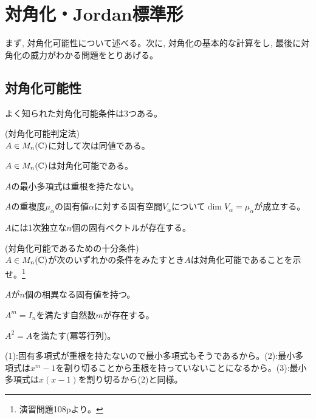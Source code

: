 \section{対角化・Jordan標準形}
まず, 対角化可能性について述べる。次に, 対角化の基本的な計算をし, 最後に対角化の威力がわかる問題をとりあげる。
\subsection{対角化可能性}
よく知られた対角化可能条件は3つある。
\besha
\begin{prop} (対角化可能判定法)\\
$A\in M_n(\mathbb{C})$に対して次は同値である。
\ben
\item $A\in M_n(\mathbb{C})$は対角化可能である。
\item $A$の最小多項式は重根を持たない。
\item $A$の重複度$\mu_{\alpha}$の固有値$\alpha$に対する固有空間$V_{\alpha}$について$\dim{V_{\alpha}} = \mu_{\alpha}$が成立する。
\item $A$には1次独立な$n$個の固有ベクトルが存在する。
\een
\end{prop}
\ensha
\begin{egprob} (対角化可能であるための十分条件)\\
$A\in M_n(\mathbb{C})$が次のいずれかの条件をみたすとき$A$は対角化可能であることを示せ。\footnote{\cite{linalg1}演習問題108pより。}
\ben
\item $A$が$n$個の相異なる固有値を持つ。
\item $A^{m} = I_n$を満たす自然数$m$が存在する。
\item $A^2 = A$を満たす(冪等行列)。
\item
\item
\een
\end{egprob}%

\begin{egans}
(1):固有多項式が重根を持たないので最小多項式もそうであるから。(2):最小多項式は$x^{m}-1$を割り切ることから重根を持っていないことになるから。(3):最小多項式は$x(x-1)$を割り切るから(2)と同様。
\end{egans}


\newpage
